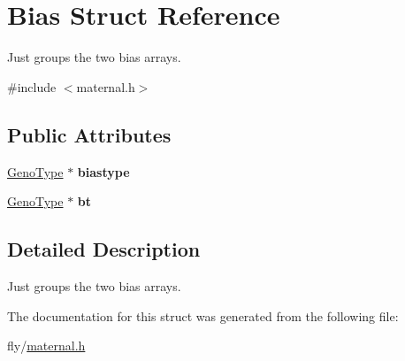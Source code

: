 \hypertarget{structBias}{
\section{Bias Struct Reference}
\label{structBias}
}


Just groups the two bias arrays.  


{\ttfamily \#include $<$maternal.h$>$}\subsection*{Public Attributes}
\begin{DoxyCompactItemize}
\item 
\hypertarget{structBias_ab98289b1d30477d257adca4bde73cd35}{
\hyperlink{structGenoType}{GenoType} $\ast$ {\bfseries biastype}}
\label{structBias_ab98289b1d30477d257adca4bde73cd35}

\item 
\hypertarget{structBias_a5d55e1cb23d76ceaf5770a373e9c7b77}{
\hyperlink{structGenoType}{GenoType} $\ast$ {\bfseries bt}}
\label{structBias_a5d55e1cb23d76ceaf5770a373e9c7b77}

\end{DoxyCompactItemize}


\subsection{Detailed Description}
Just groups the two bias arrays. 

The documentation for this struct was generated from the following file:\begin{DoxyCompactItemize}
\item 
fly/\hyperlink{maternal_8h}{maternal.h}\end{DoxyCompactItemize}
